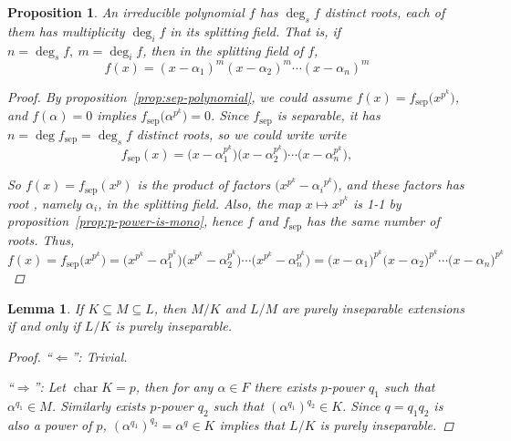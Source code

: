 \documentclass[a4paper]{article}
\DeclareMathOperator{\Char}{char}
\theoremstyle{mystyle}
\newtheorem{lemma}{Lemma}
\newtheorem{proposition}{Proposition}
\theoremstyle{remark}
\theoremstyle{definition}
\theoremstyle{definition}
\begin{document}
  \begin{proposition} \label{prop:multiplicity-insep}
    An irreducible polynomial $f$ has $\deg_s f$ distinct roots, each of them has multiplicity $\deg_i f$
    in its splitting field.
    That is, if $n = \deg_s f,\  m = \deg_i f$, then in the splitting field of $f$,
    \[ f(x) = (x - \alpha_1)^m (x - \alpha_2)^m \dotsm (x - \alpha_n)^m \]

    \begin{proof}
      By proposition~\ref{prop:sep-polynomial}, we could assume $f(x) = f_\text{sep}\big(x^{p^k}\big)$,
      and $f(\alpha) = 0$ implies $f_\text{sep}\big(\alpha^{p^k}\big) = 0$.
      Since $f_\text{sep}$ is separable, it has $n = \deg f_\text{sep} = \deg_s f$
      distinct roots, so we could write write
      \[ f_\text{sep}(x) =
        \big(x - \alpha_1^{p^k}\big) \big(x - \alpha_2^{p^k}\big) \dotsm \big(x - \alpha_n^{p^k}\big), \]

      So $f(x) = f_\text{sep}(x^p)$ is the product of factors $\big(x^{p^k} - {\alpha_i}^{p^k} \big)$,
      and these factors has root , namely $\alpha_i$, in the splitting field.
      Also, the map $x \mapsto x^{p^k}$
      is 1-1 by proposition~\ref{prop:p-power-is-mono}, hence $f$ and $f_\text{sep}$ has the same number of
      roots. Thus,
      \[ f(x) = f_\text{sep}\big( x^{p^k} \big) =
        \Big(x^{p^k} - \alpha_1^{p^k}\Big) \Big(x^{p^k} - \alpha_2^{p^k}\Big) \dotsm \Big(x^{p^k}- \alpha_n^{p^k}\Big)
        = \big(x - \alpha_1\big)^{p^k} \big(x - \alpha_2\big)^{p^k} \dotsm \big(x - \alpha_n\big)^{p^k} \]

    \end{proof}
  \end{proposition}

  \begin{lemma} \label{lemma:stack-of-pure-ext}
    If $K \subseteq M \subseteq L$, then $M/K$ and $L/M$ are purely inseparable extensions
    if and only if $L / K$ is purely inseparable.
    \begin{proof}
      ``$\Leftarrow$'': Trivial.

      ``$\Rightarrow$'':
      Let $\Char K = p$, then for any $\alpha \in F$ there exists $p$-power $q_1$ such that
      $\alpha^{q_1} \in M$. Similarly exists $p$-power $q_2$ such that $(\alpha^{q_1})^{q_2} \in K$.
      Since $q = q_1 q_2$ is also a power of $p$, $(\alpha^{q_1})^{q_2} = \alpha^q \in K$
      implies that $L/K$ is purely inseparable.
    \end{proof}
  \end{lemma}
\end{document}
